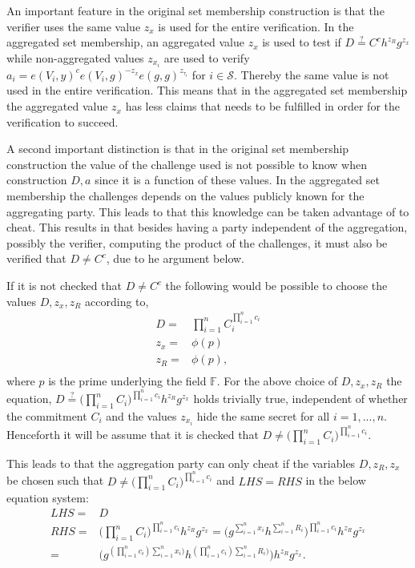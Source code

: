 An important feature in the original set membership construction is that the verifier uses the same value $z_x$ is used for the entire verification. In the aggregated set membership, an aggregated value $z_x$ is used to test if $D\overset{?}{=}C^ch^{z_R}g^{z_x}$ while non-aggregated values $z_{x_i}$ are used to verify $a_i=e(V_i,y)^ce(V_i,g)^{-z_x}e(g,g)^{z_{\tau_i}}$ for $i\in\mathcal{S}$. Thereby the same value is not used in the entire verification. This means that in the aggregated set membership the aggregated value $z_x$ has less claims that needs to be fulfilled in order for the verification to succeed. 

A second important distinction is that in the original set membership construction the value of the challenge used is not possible to know when construction $D,a$ since it is a function of these values. In the aggregated set membership the challenges depends on the values publicly known for the aggregating party. This leads to that this knowledge can be taken advantage of to cheat. This results in that besides having a party independent of the aggregation, possibly the verifier, computing the product of the challenges, it must also be verified that $D\neq C^c$, due to he argument below.

If it is not checked that $D \neq C^c$ the following would be possible to choose the values $D,z_x,z_R$ according to,
\begin{align*}
D =& \prod_{i=1}^n C_i ^{\prod_{i=1}^n c_i}	\\
z_x =& \phi(p)	\\
z_R =& \phi(p),	\\
\end{align*}
where $p$ is the prime underlying the field $\mathds{F}$. For the above choice of $D,z_x,z_R$ the equation, $D\overset{?}{=} \big(\prod_{i=1}^nC_i\big)^{\prod_{i=1}^n c_i} h^{z_R}g^{z_x}$ holds trivially true, independent of whether the commitment $C_i$ and the values $z_{x_i}$ hide the same secret for all $i=1,...,n$. Henceforth it will be assume that it is checked that $D \neq \big(\prod_{i=1}^nC_i\big)^{\prod_{i=1}^n c_i}$. 

This leads to that the aggregation party can only cheat if the variables $D,z_R,z_x$ be chosen such that $D \neq \big(\prod_{i=1}^nC_i\big)^{\prod_{i=1}^n c_i}$ and $LHS=RHS$ in the below equation system:
\begin{align*}
LHS =& D\\
RHS  =& \big(\prod_{i=1}^nC_i\big)^{\prod_{i=1}^n c_i} h^{z_R}g^{z_x} =
\big( g^{\sum_{i=1}^n x_i } h^{\sum_{i=1}^n R_i} \big) ^{\prod_{i=1}^n c_i}h^{z_R} g^{z_x} \\
=& \big( g^{ (  \prod_{i=1}^n c_i ) \sum_{i=1}^n x_i ) } h^{ ( \prod_{i=1}^n c_i ) \sum_{i=1}^n R_i ) } \big)h^{z_R} g^{z_x}.
\end{align*}

